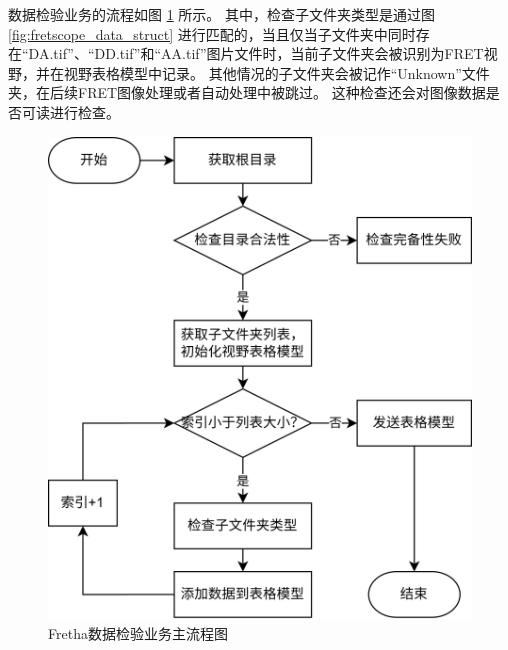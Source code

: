 数据检验业务的流程如图 \ref{fig:fretha_data_check_flow} 所示。
其中，检查子文件夹类型是通过图 \ref{fig:fretscope_data_struct} 进行匹配的，当且仅当子文件夹中同时存在“DA.tif”、“DD.tif”和“AA.tif”图片文件时，当前子文件夹会被识别为FRET视野，并在视野表格模型中记录。
其他情况的子文件夹会被记作“Unknown”文件夹，在后续FRET图像处理或者自动处理中被跳过。
这种检查还会对图像数据是否可读进行检查。
\begin{figure}[htbp]
    \centering
    \includegraphics[width=0.6\linewidth]{../figures/2/2_数据完备性检验业务.drawio.png}
    \caption{Fretha数据检验业务主流程图}
    \label{fig:fretha_data_check_flow}
\end{figure}
